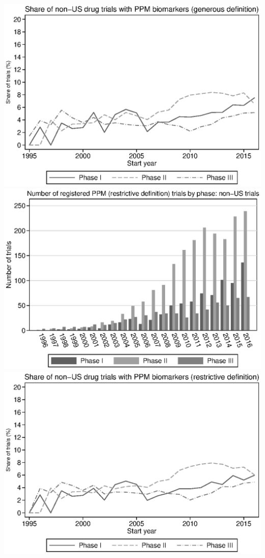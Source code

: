 \includegraphics{../figures/08b-g_ppm_share_by_phase_non-us.eps}
\includegraphics{../figures/08c-r_ppm_count_by_phase_non-us.eps}
\includegraphics{../figures/08d-r_ppm_share_by_phase_non-us.eps}
